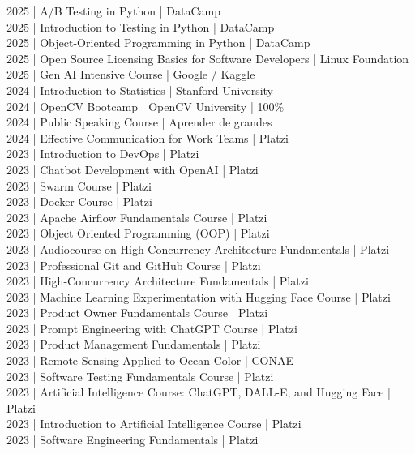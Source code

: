 {2025 | A/B Testing in Python | DataCamp \\
2025 | Introduction to Testing in Python  | DataCamp \\
2025 | Object-Oriented Programming in Python | DataCamp \\
2025 | Open Source Licensing Basics for Software Developers | Linux Foundation \\
2025 | Gen AI Intensive Course  | Google / Kaggle \\
2024 | Introduction to Statistics | Stanford University \\
2024 | OpenCV Bootcamp | OpenCV University | 100\% \\
2024 | Public Speaking Course | Aprender de grandes \\
2024 | Effective Communication for Work Teams | Platzi \\
2023 | Introduction to DevOps | Platzi \\
2023 | Chatbot Development with OpenAI | Platzi \\
2023 | Swarm Course | Platzi \\
2023 | Docker Course | Platzi \\
2023 | Apache Airflow Fundamentals Course | Platzi \\
2023 | Object Oriented Programming (OOP) | Platzi \\
2023 | Audiocourse on High-Concurrency Architecture Fundamentals | Platzi \\
2023 | Professional Git and GitHub Course | Platzi \\
2023 | High-Concurrency Architecture Fundamentals | Platzi \\
2023 | Machine Learning Experimentation with Hugging Face Course | Platzi \\
2023 | Product Owner Fundamentals Course | Platzi \\
2023 | Prompt Engineering with ChatGPT Course | Platzi \\
2023 | Product Management Fundamentals | Platzi \\
2023 | Remote Sensing Applied to Ocean Color | CONAE \\
2023 | Software Testing Fundamentals Course | Platzi \\
2023 | Artificial Intelligence Course: ChatGPT, DALL-E, and Hugging Face | Platzi \\
2023 | Introduction to Artificial Intelligence Course | Platzi \\
2023 | Software Engineering Fundamentals | Platzi \\
}
